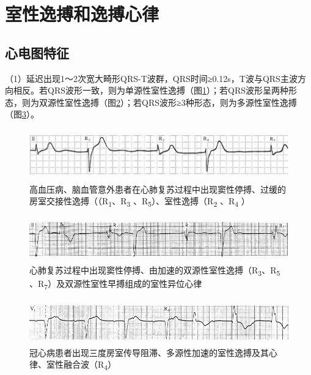 \protect\hypertarget{text00019.htmlux5cux23subid186}{}{}

\section{室性逸搏和逸搏心律}

\protect\hypertarget{text00019.htmlux5cux23subid187}{}{}

\subsection{心电图特征}

（1）延迟出现1～2次宽大畸形QRS-T波群，QRS时间≥0.12s，T波与QRS主波方向相反。若QRS波形一致，则为单源性室性逸搏（图\ref{fig12-11}）；若QRS波形呈两种形态，则为双源性室性逸搏（图\ref{fig12-12}）；若QRS波形≥3种形态，则为多源性室性逸搏（图\ref{fig12-13}）。

\begin{figure}[!htbp]
 \centering
 \includegraphics[width=5.82292in,height=0.875in]{./images/Image00205.jpg}
 \captionsetup{justification=centering}
 \caption{高血压病、脑血管意外患者在心肺复苏过程中出现窦性停搏、过缓的房室交接性逸搏（（R\textsubscript{1}、R\textsubscript{3} 、R\textsubscript{5}）、室性逸搏（R\textsubscript{2} 、R\textsubscript{4} ）}
 \label{fig12-11}
  \end{figure} 


\begin{figure}[!htbp]
 \centering
 \includegraphics[width=5.58333in,height=0.75in]{./images/Image00206.jpg}
 \captionsetup{justification=centering}
 \caption{心肺复苏过程中出现窦性停搏、由加速的双源性室性逸搏（R\textsubscript{3}、R\textsubscript{5} 、R\textsubscript{7}）及双源性室性早搏组成的室性异位心律}
 \label{fig12-12}
  \end{figure} 


\begin{figure}[!htbp]
 \centering
 \includegraphics[width=5.58333in,height=0.75in]{./images/Image00207.jpg}
 \captionsetup{justification=centering}
 \caption{冠心病患者出现三度房室传导阻滞、多源性加速的室性逸搏及其心律、室性融合波（R\textsubscript{4}）}
 \label{fig12-13}
  \end{figure} 


